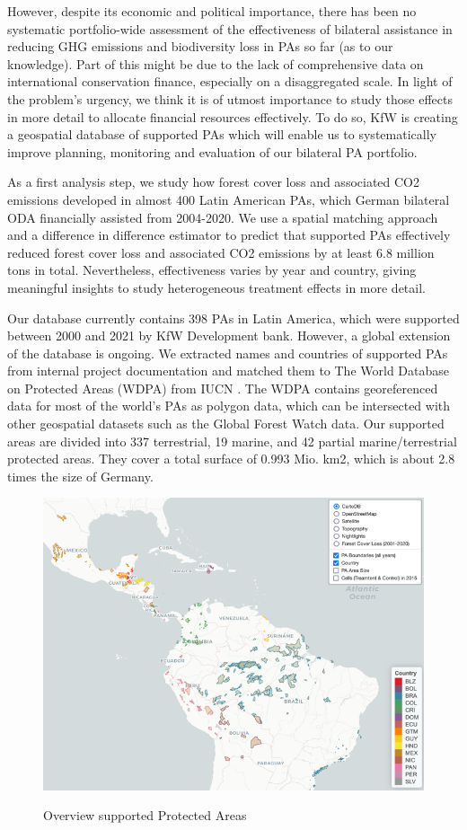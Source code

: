 \documentclass{article}
\begin{document}
However, despite its economic and political importance, there has been no systematic portfolio-wide assessment of the effectiveness of bilateral assistance in reducing GHG emissions and biodiversity loss in PAs so far (as to our knowledge). Part of this might be due to the lack of comprehensive data on international conservation finance, especially on a disaggregated scale. In light of the problem's urgency, we think it is of utmost importance to study those effects in more detail to allocate financial resources effectively. To do so, KfW is creating a geospatial database of supported PAs which will enable us to systematically improve planning, monitoring and evaluation of our bilateral PA portfolio. 

As a first analysis step, we study how forest cover loss and associated CO2 emissions developed in almost 400 Latin American PAs, which German bilateral ODA financially assisted from 2004-2020. We use a spatial matching approach and a difference in difference estimator to predict that supported PAs effectively reduced forest cover loss and associated CO2 emissions by at least 6.8 million tons in total. Nevertheless, effectiveness varies by year and country, giving meaningful insights to study heterogeneous treatment effects in more detail.



Our database currently contains 398 PAs in Latin America, which were supported between 2000 and 2021 by KfW Development bank. However, a global extension of the database is ongoing. We extracted names and countries of supported PAs from internal project documentation and matched them to The World Database on Protected Areas (WDPA) from IUCN \citep{unep2019user}. The WDPA contains georeferenced data for most of the world's PAs as polygon data, which can be intersected with other geospatial datasets such as the Global Forest Watch data. Our supported areas are divided into 337 terrestrial, 19 marine, and 42 partial marine/terrestrial protected areas. They cover a total surface of 0.993 Mio. km2, which is about 2.8 times the size of Germany.

\begin{figure}[H]
\centering
\caption{Overview supported Protected Areas}
\includegraphics[width=0.8\linewidth]{"figures/PAs"}
\label{fig:PAs}
\end{figure}
\end{document}
